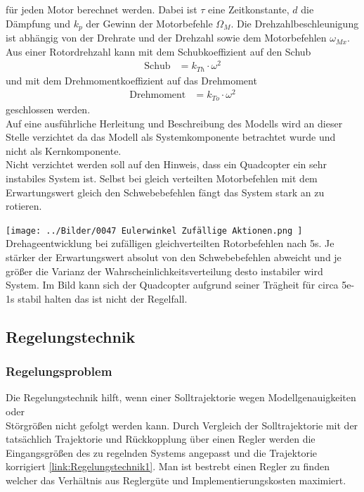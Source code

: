 für jeden Motor berechnet werden.
Dabei ist $\tau$ eine Zeitkonstante, $d$ die Dämpfung und $k_p$ der Gewinn der Motorbefehle $\Omega_{M}$.
Die Drehzahlbeschleunigung ist abhängig von der Drehrate und der Drehzahl sowie dem Motorbefehlen $\omega_{Mx}$. Aus einer Rotordrehzahl kann mit dem Schubkoeffizient auf den Schub
\begin{align}
	\text{Schub} &= k_{Th}\cdot \omega^2
\end{align} und mit dem Drehmomentkoeffizient auf das Drehmoment
\begin{align}
	\text{Drehmoment} &= k_{To}\cdot \omega^2
\end{align}
geschlossen werden.\\
Auf eine ausführliche Herleitung und Beschreibung des Modells wird an dieser Stelle verzichtet da das Modell als Systemkomponente betrachtet wurde und nicht als Kernkomponente.\\
Nicht verzichtet werden soll auf den Hinweis, dass ein Quadcopter ein sehr instabiles System ist. Selbst bei gleich verteilten Motorbefehlen mit dem Erwartungswert gleich den Schwebebefehlen fängt das System stark an zu rotieren.
\begin{center}
	\texttt{[image: ../Bilder/0047 Eulerwinkel Zufällige Aktionen.png
	]}{\\Drehageentwicklung bei zufälligen gleichverteilten Rotorbefehlen nach 5s. Je stärker der Erwartungswert absolut von den Schwebebefehlen abweicht und je größer die Varianz der Wahrscheinlichkeitsverteilung desto instabiler wird System. Im Bild kann sich der Quadcopter aufgrund seiner Trägheit für circa 5e-1s stabil halten das ist nicht der Regelfall.}
\end{center}



\subsection{Regelungstechnik}

\subsubsection{Regelungsproblem}
Die Regelungstechnik hilft, wenn einer Solltrajektorie wegen Modellgenauigkeiten oder\\ Störgrößen nicht gefolgt werden kann. Durch Vergleich der Solltrajektorie mit der tatsächlich Trajektorie und Rückkopplung über einen Regler werden die Eingangsgrößen des zu regelnden Systems angepasst und die Trajektorie korrigiert \ref{link:Regelungstechnik1}. Man ist bestrebt einen Regler zu finden welcher das Verhältnis aus Reglergüte und Implementierungskosten maximiert.

